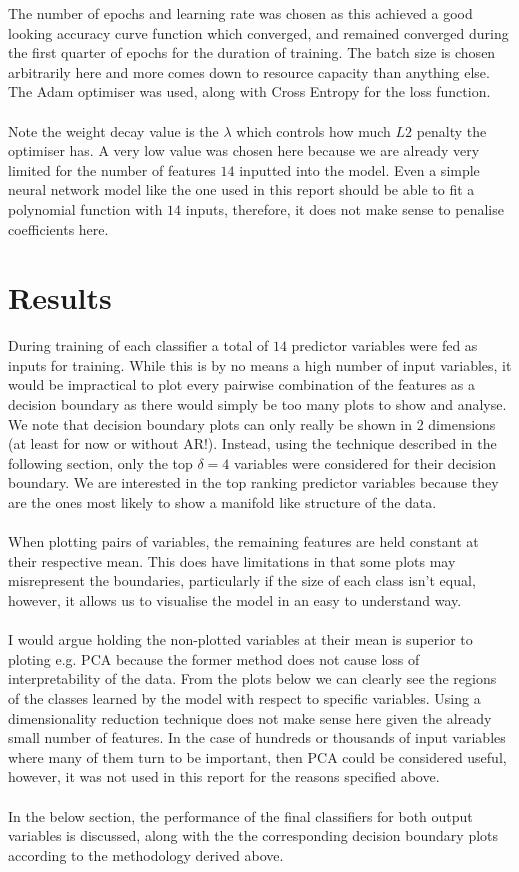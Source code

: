 \documentclass{article}
\begin{document}
The number of epochs and learning rate was chosen as this achieved a good looking accuracy curve function which converged, and remained converged during the first quarter of epochs for the duration of training. The batch size is chosen arbitrarily here and more comes down to resource capacity than anything else. The Adam optimiser was used, along with Cross Entropy for the loss function. \\
\\
Note the weight decay value is the $\lambda$ which controls how much $L2$ penalty the optimiser has. A very low value was chosen here because we are already very limited for the number of features $14$ inputted into the model. Even a simple neural network model like the one used in this report should be able to fit a polynomial function with $14$ inputs, therefore, it does not make sense to penalise coefficients here.

\newpage
\section{Results}

During training of each classifier a total of $14$ predictor variables were fed as inputs for training. While this is by no means a high number of input variables, it would be impractical to plot every pairwise combination of the features as a decision boundary as there would simply be too many plots to show and analyse. We note that decision boundary plots can only really be shown in 2 dimensions (at least for now or without AR!). Instead, using the technique described in the following section, only the top $\delta = 4$ variables were considered for their decision boundary. We are interested in the top ranking predictor variables because they are the ones most likely to show a manifold like structure of the data. \\
\\
When plotting pairs of variables, the remaining features are held constant at their respective mean. This does have limitations in that some plots may misrepresent the boundaries, particularly if the size of each class isn't equal, however, it allows us to visualise the model in an easy to understand way. \\
\\
I would argue holding the non-plotted variables at their mean is superior to ploting e.g. PCA because the former method does not cause loss of interpretability of the data. From the plots below we can clearly see the regions of the classes learned by the model with respect to specific variables. Using a dimensionality reduction technique does not make sense here given the already small number of features. In the case of hundreds or thousands of input variables where many of them turn to be important, then PCA could be considered useful, however, it was not used in this report for the reasons specified above. \\
\\
In the below section, the performance of the final classifiers for both output variables is discussed, along with the the corresponding decision boundary plots according to the methodology derived above.
\end{document}
